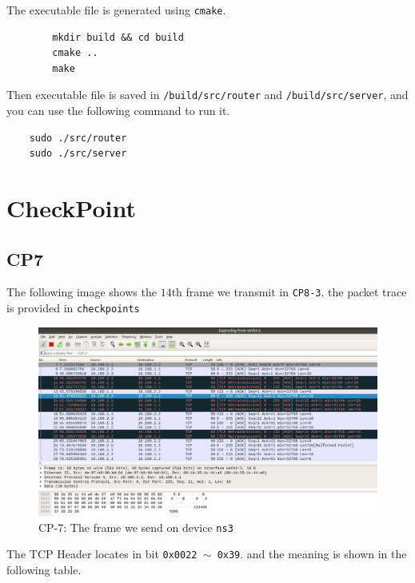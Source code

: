 \documentclass[11pt]{article}
\begin{document}
	The executable file is generated using \texttt{cmake}.
	
	\lstset{language = bash}
	\begin{lstlisting}
		mkdir build && cd build
		cmake ..
		make
	\end{lstlisting}
	
	Then executable file is saved in \texttt{/build/src/router} and \texttt{/build/src/server}, and you can use the following command to run it.
	
	\begin{lstlisting}
	sudo ./src/router
	sudo ./src/server
	\end{lstlisting}

	
	\section{CheckPoint}
	
	\subsection*{CP7}
	
	The following image shows the $14$th frame we transmit in \texttt{CP8-3}. the packet trace is provided in \texttt{checkpoints}
	
	\begin{figure}[htbp]
	\centering
	\includegraphics[width=0.9\linewidth]{../lab-netstack-premium-master/checkpoints/CP7.png}
	\caption{CP-7: The frame we send on device \texttt{ns3}}
	\label{fig:CP7}
	\end{figure}
	
	\par The TCP Header locates in bit \texttt{0x0022 $\sim$ 0x39}. and the meaning is shown in the following table.
	
\end{document}
